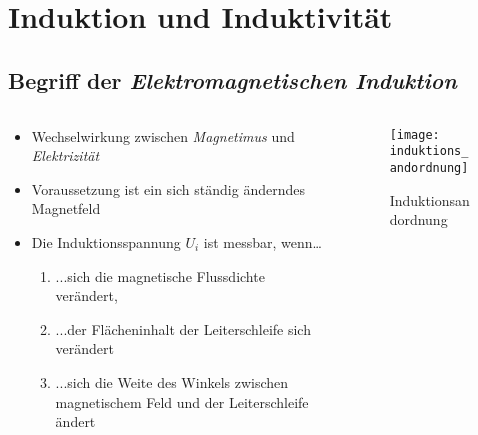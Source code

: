 \section{Induktion und Induktivität}
\subsection{Begriff der \textit{Elektromagnetischen Induktion}}
\begin{frame}
    \makeframetitle

    \begin{columns}
        \begin{column}{0.65\textwidth}
            \begin{itemize}
                \item \alert{Wechselwirkung} zwischen
                    \textit{Magnetimus} und \textit{Elektrizität}
                \item Voraussetzung ist ein sich ständig \alert{änderndes}
                    Magnetfeld
                \item Die Induktionsspannung $U_i$ ist messbar, wenn\dots
                    \begin{enumerate}
                        \item ...sich die magnetische Flussdichte \alert{verändert},
                        \item ...der Flächeninhalt der Leiterschleife
                            sich \alert{verändert}
                        \item ...sich die Weite des Winkels
                            zwischen magnetischem Feld und der Leiterschleife
                            \alert{ändert}
                    \end{enumerate}
            \end{itemize}
        \end{column}
        \begin{column}{0.35\textwidth}
        \begin{figure}
            \centering
            \texttt{[image: induktions\_andordnung]}
            \caption{Induktionsandordnung \cite{leifi_induktions_anordnung}}
        \end{figure}
        \end{column}
    \end{columns}
\end{frame}

